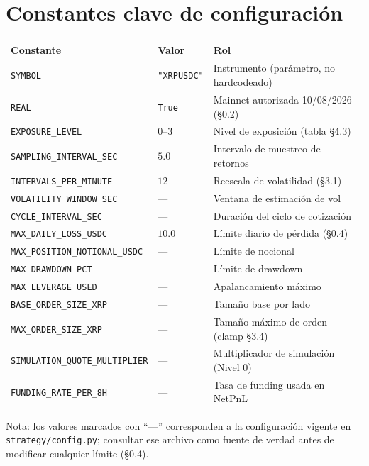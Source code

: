 \documentclass[11pt,a4paper]{article}
\newcommand{\codigo}[1]{\texttt{#1}}
\begin{document}
\section{Constantes clave de configuración}

\begin{center}
\begin{longtable}{lll}
\toprule
\textbf{Constante} & \textbf{Valor} & \textbf{Rol} \\
\midrule
\endhead
\codigo{SYMBOL} & \codigo{"XRPUSDC"} & Instrumento (parámetro, no hardcodeado) \\
\codigo{REAL} & \codigo{True} & Mainnet autorizada 10/08/2026 (§0.2) \\
\codigo{EXPOSURE\_LEVEL} & $0$--$3$ & Nivel de exposición (tabla §4.3) \\
\codigo{SAMPLING\_INTERVAL\_SEC} & $5.0$ & Intervalo de muestreo de retornos \\
\codigo{INTERVALS\_PER\_MINUTE} & $12$ & Reescala de volatilidad (§3.1) \\
\codigo{VOLATILITY\_WINDOW\_SEC} & — & Ventana de estimación de vol \\
\codigo{CYCLE\_INTERVAL\_SEC} & — & Duración del ciclo de cotización \\
\codigo{MAX\_DAILY\_LOSS\_USDC} & $10.0$ & Límite diario de pérdida (§0.4) \\
\codigo{MAX\_POSITION\_NOTIONAL\_USDC} & — & Límite de nocional \\
\codigo{MAX\_DRAWDOWN\_PCT} & — & Límite de drawdown \\
\codigo{MAX\_LEVERAGE\_USED} & — & Apalancamiento máximo \\
\codigo{BASE\_ORDER\_SIZE\_XRP} & — & Tamaño base por lado \\
\codigo{MAX\_ORDER\_SIZE\_XRP} & — & Tamaño máximo de orden (clamp §3.4) \\
\codigo{SIMULATION\_QUOTE\_MULTIPLIER} & — & Multiplicador de simulación (Nivel 0) \\
\codigo{FUNDING\_RATE\_PER\_8H} & — & Tasa de funding usada en NetPnL \\
\bottomrule
\end{longtable}
\end{center}

Nota: los valores marcados con ``—'' corresponden a la configuración
vigente en \codigo{strategy/config.py}; consultar ese archivo como
fuente de verdad antes de modificar cualquier límite (§0.4).
\end{document}
